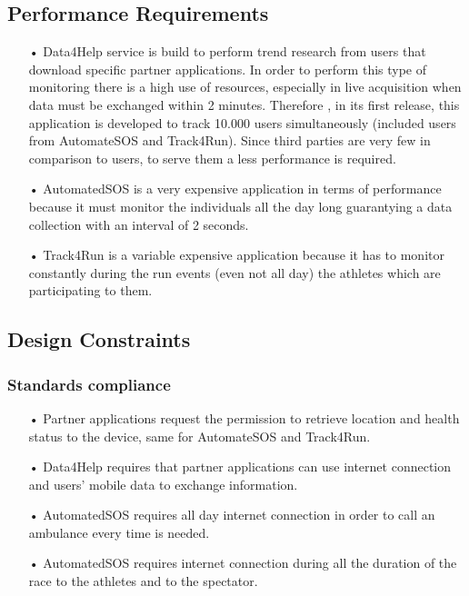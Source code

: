 \subsection{Performance Requirements}
\begin{enumerate} 
\item[•] Data4Help service is build to perform trend research from users that download specific partner applications. In order to perform this type of monitoring there is a high use of resources, especially in live acquisition when data must be exchanged within 2 minutes. Therefore , in its first release, this application is developed to track 10.000 users simultaneously (included users from AutomateSOS and Track4Run). 
Since third parties are very few in comparison to users, to serve them a less performance is required. 

\item[•] AutomatedSOS is a very expensive application in terms of performance because it must monitor the individuals all the day long guarantying a data collection with an interval of 2 seconds.

\item[•] Track4Run is a variable expensive application because it has to monitor constantly during the run events (even not all day) the athletes which are participating to them.
\end{enumerate}

\subsection{Design Constraints}
\subsubsection{Standards compliance}
\begin{enumerate} 
\item[•] Partner applications request the permission to retrieve location and health status to the device, same for AutomateSOS and Track4Run.
\item[•] Data4Help requires that partner applications can use internet connection and users' mobile data to exchange information.
\item[•] AutomatedSOS requires all day internet connection in order to call an ambulance every time is needed.
\item[•] AutomatedSOS requires internet connection during all the duration of the race to the athletes and to the spectator.
\end{enumerate}

